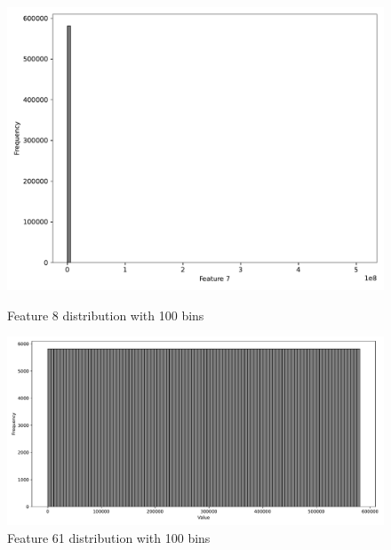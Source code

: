 \documentclass[11pt]{article}
\begin{document}
\begin{figure}[H]
	\centering
	
	\begin{minipage}[t]{0.48\textwidth}
		\centering
		\includegraphics[width=\textwidth]{images/8_distribution.pdf}
		\caption{Feature 8 distribution with 100 bins}
		\label{fig:f8}
	\end{minipage}
	\hfill
	\begin{minipage}[t]{0.48\textwidth}
		\centering
		\includegraphics[width=\textwidth]{images/61_distribution.pdf}
		\caption{Feature 61 distribution with 100 bins}
		\label{fig:f61}
	\end{minipage}
	
\end{figure}
\end{document}
